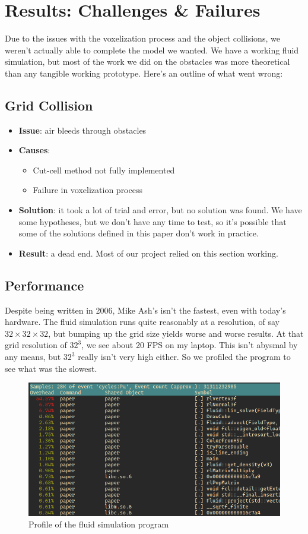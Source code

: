 \documentclass[a4paper,12pt]{article}
\begin{document}
\section{Results: Challenges \& Failures}
Due to the issues with the voxelization process and the object collisions, we
weren't actually able to complete the model we wanted. We have a working fluid
simulation, but most of the work we did on the obstacles was more theoretical
than any tangible working prototype. Here's an outline of what went wrong:

\subsection{Grid Collision}
\begin{itemize}
	\item{\textbf{Issue}: air bleeds through obstacles}
	\item{\textbf{Causes}:}
		\begin{itemize}
			\item{Cut-cell method not fully implemented}
			\item{Failure in voxelization process}
		\end{itemize}
	\item{
			\textbf{Solution}: it took a lot of trial and error, but no solution
			was found. We have some hypotheses, but we don't have any time to test,
			so it's possible that some of the solutions defined in this paper don't
			work in practice.
		}
	\item{\textbf{Result}: a dead end. Most of our project relied on this section working.}
\end{itemize}

\subsection{Performance}
Despite being written in 2006, Mike Ash's isn't the fastest, even with today's
hardware. The fluid simulation runs quite reasonably at a resolution, of say
$32\times32\times32$, but bumping up the grid size yields worse and worse results.
At that grid resolution of $32^3$, we see about 20 FPS on my laptop. This isn't
abysmal by any means, but $32^3$ really isn't very high either. So we profiled
the program to see what was the slowest.

\begin{figure}[H]
	\centering
	\includegraphics[width=\textwidth]{resources/profile.png}
	\caption{Profile of the fluid simulation program}
\end{figure}
\end{document}
